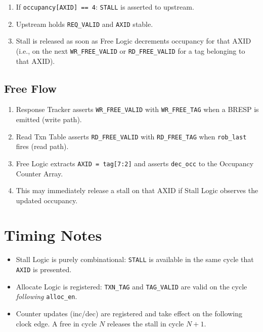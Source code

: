 \documentclass[11pt,a4paper]{article}
\begin{document}
\begin{enumerate}
  \item If \texttt{occupancy[AXID] == 4}: \texttt{STALL} is asserted
        to upstream.
  \item Upstream holds \texttt{REQ\_VALID} and \texttt{AXID} stable.
  \item Stall is released as soon as Free Logic decrements occupancy
        for that AXID (i.e., on the next \texttt{WR\_FREE\_VALID} or
        \texttt{RD\_FREE\_VALID} for a tag belonging to that AXID).
\end{enumerate}

\subsection{Free Flow}

\begin{enumerate}
  \item Response Tracker asserts \texttt{WR\_FREE\_VALID} with
        \texttt{WR\_FREE\_TAG} when a BRESP is emitted (write path).
  \item Read Txn Table asserts \texttt{RD\_FREE\_VALID} with
        \texttt{RD\_FREE\_TAG} when \texttt{rob\_last} fires (read path).
  \item Free Logic extracts \texttt{AXID = tag[7:2]} and asserts
        \texttt{dec\_occ} to the Occupancy Counter Array.
  \item This may immediately release a stall on that AXID if
        Stall Logic observes the updated occupancy.
\end{enumerate}

\section{Timing Notes}

\begin{itemize}
  \item Stall Logic is purely combinational: \texttt{STALL} is available
        in the same cycle that \texttt{AXID} is presented.
  \item Allocate Logic is registered: \texttt{TXN\_TAG} and
        \texttt{TAG\_VALID} are valid on the cycle \emph{following}
        \texttt{alloc\_en}.
  \item Counter updates (inc/dec) are registered and take effect on the
        following clock edge. A free in cycle $N$ releases the stall in
        cycle $N{+}1$.
\end{itemize}
\end{document}

